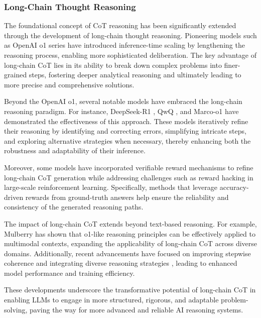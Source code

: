 \subsubsection{Long-Chain Thought Reasoning}
The foundational concept of CoT reasoning has been significantly extended through the development of long-chain thought reasoning. Pioneering models such as OpenAI o1 series \cite{O1} have introduced inference-time scaling by lengthening the reasoning process, enabling more sophisticated deliberation. The key advantage of long-chain CoT lies in its ability to break down complex problems into finer-grained steps, fostering deeper analytical reasoning and ultimately leading to more precise and comprehensive solutions.

Beyond the OpenAI o1, several notable models have embraced the long-chain reasoning paradigm. For instance, DeepSeek-R1 \cite{deepseek}, QwQ \cite{qwq}, and Marco-o1 \cite{zhao2024marco} have demonstrated the effectiveness of this approach. These models iteratively refine their reasoning by identifying and correcting errors, simplifying intricate steps, and exploring alternative strategies when necessary, thereby enhancing both the robustness and adaptability of their inference.

Moreover, some models have incorporated verifiable reward mechanisms to refine long-chain CoT generation while addressing challenges such as reward hacking in large-scale reinforcement learning. Specifically, methods that leverage accuracy-driven rewards from ground-truth answers \cite{team2025kimi,tinyzero} help ensure the reliability and consistency of the generated reasoning paths.


The impact of long-chain CoT extends beyond text-based reasoning. For example, Mulberry \cite{yao2024mulberry} has shown that o1-like reasoning principles can be effectively applied to multimodal contexts, expanding the applicability of long-chain CoT across diverse domains. Additionally, recent advancements have focused on improving stepwise coherence and integrating diverse reasoning strategies \cite{team2025kimi}, leading to enhanced model performance and training efficiency.

These developments underscore the transformative potential of long-chain CoT in enabling LLMs to engage in more structured, rigorous, and adaptable problem-solving, paving the way for more advanced and reliable AI reasoning systems.